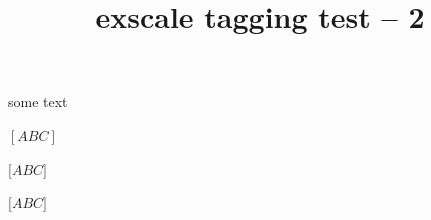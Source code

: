 \documentclass{article}
\title{exscale tagging test -- 2}
\begin{document}
some text

$[ABC]$

$\Big[ABC\Big]$

$\big[ABC\big]$
\end{document}
